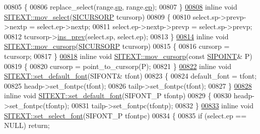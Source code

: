 \begin{DoxyCode}
00805 \{
00806     replace\_select(range.\hyperlink{struct_s_i_r_a_n_g_e_a7acdf296d873d6ed6fc203674109b715}{sp}, range.\hyperlink{struct_s_i_r_a_n_g_e_aaa89b5ae16be7b890eba048bc212feec}{ep});
00807 \}
\hyperlink{class_s_i_t_e_x_t_abb0fb0438be292cc363813dece5b6258}{00808} \textcolor{keyword}{inline} \textcolor{keywordtype}{void} \hyperlink{class_s_i_t_e_x_t_abb0fb0438be292cc363813dece5b6258}{SITEXT::mov\_select}(\hyperlink{class_s_i_c_h_a_r_n_o_d_e}{SICURSORP} tcursorp)
00809 \{
00810     select.sp->prevp->nextp = select.ep->nextp;
00811     select.ep->nextp->prevp = select.sp->prevp;
00812     tcursorp->\hyperlink{class_s_i_c_h_a_r_n_o_d_e_a0aba68c10438db18bea07bb77d70f839}{ins\_prev}(select.sp, select.ep);
00813 \}
\hyperlink{class_s_i_t_e_x_t_a79c57242ea31d6792f319aaf5ac8d8f0}{00814} \textcolor{keyword}{inline} \textcolor{keywordtype}{void} \hyperlink{class_s_i_t_e_x_t_a79c57242ea31d6792f319aaf5ac8d8f0}{SITEXT::mov\_cursorp}(\hyperlink{class_s_i_c_h_a_r_n_o_d_e}{SICURSORP} tcursorp)
00815 \{
00816     cursorp = tcursorp;
00817 \}
\hyperlink{class_s_i_t_e_x_t_a4542e94a4f3d3e4d47983bf051dc7ec4}{00818} \textcolor{keyword}{inline} \textcolor{keywordtype}{void} \hyperlink{class_s_i_t_e_x_t_a79c57242ea31d6792f319aaf5ac8d8f0}{SITEXT::mov\_cursorp}(\textcolor{keyword}{const} \hyperlink{struct_s_i_p_o_i_n_t}{SIPOINT}& P)
00819 \{
00820     cursorp = point\_to\_cursorp(P);
00821 \}
\hyperlink{class_s_i_t_e_x_t_a3e04be8b17cd6702fc52158f9b3b276b}{00822} \textcolor{keyword}{inline} \textcolor{keywordtype}{void} \hyperlink{class_s_i_t_e_x_t_a3e04be8b17cd6702fc52158f9b3b276b}{SITEXT::set\_default\_font}(SIFONT& tfont)
00823 \{
00824     default\_font = tfont;
00825     headp->set\_fontpc(tfont);
00826     tailp->set\_fontpc(tfont);
00827 \}
\hyperlink{class_s_i_t_e_x_t_a8fcd320042283b60f57630bdb8fd5bc8}{00828} \textcolor{keyword}{inline} \textcolor{keywordtype}{void} \hyperlink{class_s_i_t_e_x_t_a3e04be8b17cd6702fc52158f9b3b276b}{SITEXT::set\_default\_font}(SIFONT\_P tfontp)
00829 \{
00830     headp->set\_fontpc(tfontp);
00831     tailp->set\_fontpc(tfontp);
00832 \}
\hyperlink{class_s_i_t_e_x_t_a4e33142038f2ba1d42660dec1134d2f9}{00833} \textcolor{keyword}{inline} \textcolor{keywordtype}{void} \hyperlink{class_s_i_t_e_x_t_a4e33142038f2ba1d42660dec1134d2f9}{SITEXT::set\_select\_font}(SIFONT\_P tfontpc)
00834 \{
00835     \textcolor{keywordflow}{if} (select.ep == NULL) \textcolor{keywordflow}{return};

\end{DoxyCode}

